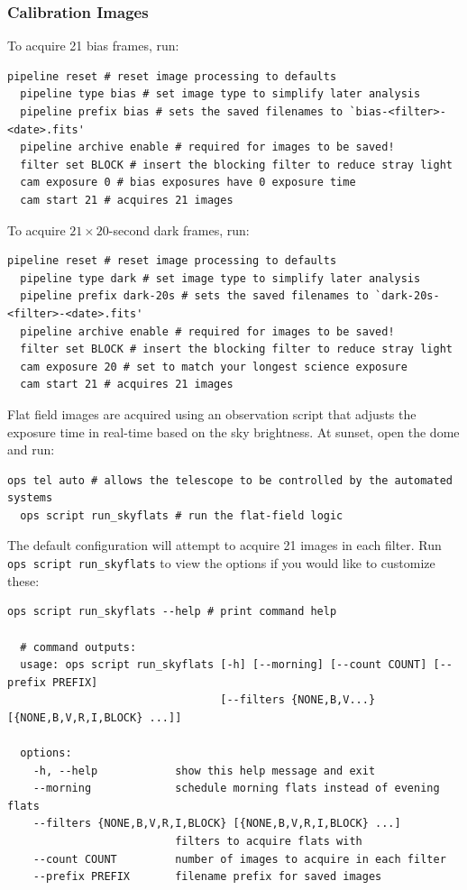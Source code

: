 \documentclass[12pt,a4paper]{article}
\begin{document}
\subsubsection{Calibration Images}
To acquire 21 bias frames, run:
\\
\begin{lstlisting}[language=commands]
  pipeline reset # reset image processing to defaults
  pipeline type bias # set image type to simplify later analysis
  pipeline prefix bias # sets the saved filenames to `bias-<filter>-<date>.fits'
  pipeline archive enable # required for images to be saved!
  filter set BLOCK # insert the blocking filter to reduce stray light
  cam exposure 0 # bias exposures have 0 exposure time
  cam start 21 # acquires 21 images
\end{lstlisting}

To acquire $21 \times 20$-second dark frames, run:
\\
\begin{lstlisting}[language=commands]
  pipeline reset # reset image processing to defaults
  pipeline type dark # set image type to simplify later analysis
  pipeline prefix dark-20s # sets the saved filenames to `dark-20s-<filter>-<date>.fits'
  pipeline archive enable # required for images to be saved!
  filter set BLOCK # insert the blocking filter to reduce stray light
  cam exposure 20 # set to match your longest science exposure
  cam start 21 # acquires 21 images
\end{lstlisting}

Flat field images are acquired using an observation script that adjusts the exposure time in real-time based on the sky brightness. At sunset, open the dome and run:
\\
\begin{lstlisting}[language=commands]
  ops tel auto # allows the telescope to be controlled by the automated systems
  ops script run_skyflats # run the flat-field logic
\end{lstlisting}

The default configuration will attempt to acquire 21 images in each filter. Run \texttt{ops script run\_skyflats} to view the options if you would like to customize these:
\\
\begin{lstlisting}[language=commands]
  ops script run_skyflats --help # print command help

  # command outputs:
  usage: ops script run_skyflats [-h] [--morning] [--count COUNT] [--prefix PREFIX]
                                 [--filters {NONE,B,V...} [{NONE,B,V,R,I,BLOCK} ...]] 
  
  options:
    -h, --help            show this help message and exit
    --morning             schedule morning flats instead of evening flats
    --filters {NONE,B,V,R,I,BLOCK} [{NONE,B,V,R,I,BLOCK} ...]
                          filters to acquire flats with
    --count COUNT         number of images to acquire in each filter
    --prefix PREFIX       filename prefix for saved images
\end{lstlisting}
\end{document}
